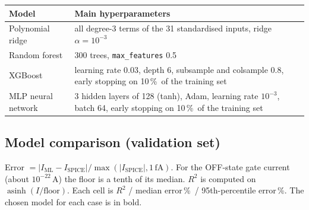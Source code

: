 \documentclass[10pt]{article}
\newcommand{\pct}{\,\%}
\begin{document}
\begin{table}[H]
\centering
\begin{tabularx}{\textwidth}{@{}p{3.4cm}L@{}}
\toprule
Model & Main hyperparameters \\
\midrule
Polynomial ridge & all degree-3 terms of the 31 standardised inputs, ridge $\alpha = 10^{-3}$ \\
Random forest & 300 trees, \texttt{max\_features} 0.5 \\
XGBoost & learning rate 0.03, depth 6, subsample and colsample 0.8, early stopping on 10\pct\ of the training set \\
MLP neural network & 3 hidden layers of 128 (tanh), Adam, learning rate $10^{-3}$, batch 64, early stopping on 10\pct\ of the training set \\
\bottomrule
\end{tabularx}
\end{table}

\subsection*{Model comparison (validation set)}

Error $= |I_\text{ML} - I_\text{SPICE}| / \max(|I_\text{SPICE}|, 1\,\text{fA})$. For the OFF-state
gate current (about $10^{-22}$\,A) the floor is a tenth of its median. $R^2$ is computed on
$\operatorname{asinh}(I/\text{floor})$. Each cell is $R^2$ / median error\pct\ / 95th-percentile
error\pct. The chosen model for each case is in bold.
\end{document}
